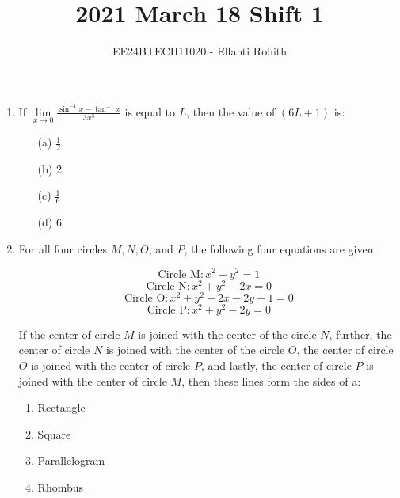 \documentclass[journal,12pt,onecolumn]{IEEEtran}
\theoremstyle{remark}
\begin{document}

\vspace{3cm}

\title{2021 March 18 Shift 1}
\author{EE24BTECH11020 -  Ellanti Rohith}
\maketitle

\renewcommand{\thefigure}{\theenumi}
\renewcommand{\thetable}{\theenumi}






\begin{enumerate}



\item If $\lim\limits_{x \to 0} \frac{\sin^{-1} x - \tan^{-1} x}{3x^3}$ is equal to $L$, then the value of $(6L + 1)$ is:
\begin{multicols}{4}
\begin{enumerate}
     \item[(a)] $\frac{1}{2}$
    \item[(b)] $2$
    \item[(c)] $\frac{1}{6}$
    \item[(d)] $6$
\end{enumerate}
\end{multicols}

   
\item For all four circles $M, N, O$, and $P$, the following four equations are given:

\[\text{Circle M}: x^2 + y^2 = 1\]
\[\text{Circle N}: x^2 + y^2 - 2x = 0\]
\[\text{Circle O}: x^2 + y^2 - 2x - 2y + 1 = 0\]
\[\text{Circle P}: x^2 + y^2 - 2y = 0\]

If the center of circle $M$ is joined with the center of the circle $N$, further, the center of circle $N$ is joined with the center of the circle $O$, the center of circle $O$ is joined with the center of circle $P$, and lastly, the center of circle $P$ is joined with the center of circle $M$, then these lines form the sides of a:
\begin{multicols}{2}
\begin{enumerate}
    \item Rectangle
    \item Square
    \item Parallelogram
    \item Rhombus
\end{enumerate}
    

\end{multicols}
\end{enumerate}
\end{document}
